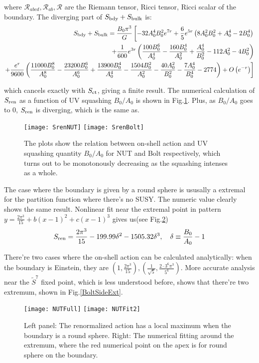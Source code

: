 \documentclass[12pt, a4paper]{article}
\numberwithin{equation}{section}
\newcommand{\be}{\begin{equation}}
\newcommand{\ee}{\end{equation}}
\newcommand{\cR}{\mathcal{R}}
\begin{document}
	where $\cR_{abcd}, \cR_{ab}, \cR$ are the Riemann tensor, Ricci tensor, Ricci scalar of the boundary. The diverging part of $S_{\rm bdy} + S_{\rm bulk}$ is:
\be
\begin{aligned}
	S_{\rm bdy} + S_{\rm bulk} = \frac{B_0\pi^3}{G}\left[-32 A_0^4 B_0^2 e^{7 r}+\frac{6}{5} e^{5 r} \left(8 A_0^2 B_0^2+A_0^4-2 B_0^4\right)\right.\\
	+\frac{1}{600} e^{3 r} \left(\frac{100
		B_0^6}{A_0^4}-\frac{160 B_0^4}{A_0^2}+\frac{A_0^4}{B_0^2}-112 A_0^2-4 B_0^2\right)\\
\left.	+\frac{e^r }{9600}\left(\frac{11000
			B_0^8}{A_0^8}-\frac{23200 B_0^6}{A_0^6}+\frac{13900 B_0^4}{A_0^4}-\frac{1504 B_0^2}{A_0^2}-\frac{40
			A_0^2}{B_0^2}-\frac{7 A_0^4}{B_0^4}-2774\right)+O\left(e^{-r}\right)\right]
\end{aligned}
\ee
	
	which cancels exactly with $S_{\rm ct}$, giving a finite result. The numerical calculation of $S_{\rm ren}$ as a function of UV squashing $B_0/A_0$ is shown in Fig.\ref{Sren}. Plus, as $B_0/A_0$ goes to 0, $S_{\rm ren}$ is diverging, which is the same as\cite{Bobev:2016sh}.

\begin{figure}[t]
	\centering
	\texttt{[image: SrenNUT]}
	\hfil
	\texttt{[image: SrenBolt]}
	\caption{{\rm The plots show the relation between on-shell action and UV squashing quantity $B_0/A_0$ for NUT and Bolt respectively, which turns out to be monotonously decreasing as the squashing intenses as a whole.}}
	\label{Sren}
\end{figure}

	The case where the boundary is given by a round sphere is ususally a extremal for the partition function where there's no SUSY\cite{Bobev:2017pf}. The numeric value clearly shows the same result. Nonlinear fit near the extremal point in pattern $y = \frac{2\pi^3}{15}+b(x-1)^2+c(x-1)^3$ gives us(see Fig.\ref{Sren2})
\be
	S_{{\rm ren}} = \frac{2\pi^3}{15} - 199.99 \delta^2 - 1505.32 \delta^3,\quad \delta \equiv \frac{B_0}{A_0}-1
\ee

	There're two cases where the on-shell action can be calculated analytically: when the boundary is Einstein, they are $\left(1, \frac{2\pi^3}{15}\right), \left(\frac{1}{\sqrt{5}}, \frac{2\cdot 3^6 \pi ^3}{5^6}\right)$. More accurate analysis near the $\tilde{S}^7$ fixed point, which is less understood before, shows that there're two extremum, shown in Fig.\ref{BoltSideExt}.

\begin{figure}[t]
	\centering
	\texttt{[image: NUTFull]}
	\hfil
	\texttt{[image: NUTFit2]}
	\caption{{\rm Left panel: The renormalized action has a local maximum when the boundary is a round sphere. Right: The numerical fitting around the extremum, where the red numerical point on the apex is for round sphere on the boundary.}}
	\label{Sren2}
\end{figure}
\end{document}
